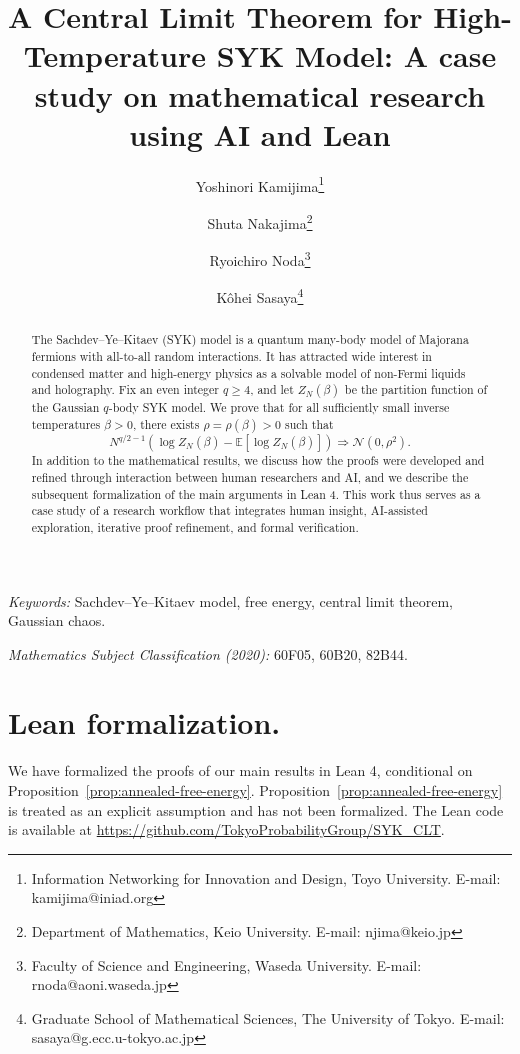 \documentclass[11pt]{article}
\title{A Central Limit Theorem for High-Temperature SYK Model: A case study on mathematical research using AI and Lean}
\author{Yoshinori Kamijima\thanks{Information Networking for Innovation and Design, Toyo University. E-mail: kamijima@iniad.org}
\and Shuta Nakajima\thanks{Department of Mathematics, Keio University. E-mail: njima@keio.jp}
\and Ryoichiro Noda\thanks{Faculty of Science and Engineering, Waseda University.
E-mail: r\textunderscore noda@aoni.waseda.jp}
\and K\^{o}hei Sasaya\thanks{Graduate School of Mathematical Sciences, The University of Tokyo. E-mail: sasaya@g.ecc.u-tokyo.ac.jp}
}
\date{}
\theoremstyle{remark}
\newcommand{\E}{\mathbb E}
\newcommand{\N}{\mathcal N}
\begin{document}
\maketitle

\begin{abstract}
The Sachdev--Ye--Kitaev (SYK) model is a quantum many-body model of Majorana
fermions with all-to-all random interactions. It has attracted wide interest in condensed matter and high-energy physics as a solvable model of non-Fermi liquids and holography. Fix an even integer $q\geq4$, and let $Z_N(\beta)$ be the
partition function of the Gaussian $q$-body SYK model.  We prove that for all sufficiently small inverse temperatures
$\beta > 0$, there exists $\rho=\rho(\beta)>0$ such that
\[
N^{q/2 -1}(\log Z_N(\beta)-\E[\log Z_N(\beta)])
  \Longrightarrow \N(0,\rho^2).
\]
In addition to the mathematical results, we discuss how the proofs were developed and refined through interaction between human researchers and AI, and we describe the subsequent formalization of the main arguments in Lean 4.
This work thus serves as a case study of a research workflow that integrates human insight, AI-assisted exploration, iterative proof refinement, and formal verification.
\end{abstract}

\noindent\emph{Keywords:} Sachdev--Ye--Kitaev model,
free energy, central limit theorem, Gaussian chaos.

\medskip
\noindent\emph{Mathematics Subject Classification (2020):}
60F05, 60B20, 82B44.








\appendix
\section*{Lean formalization.}
We have formalized the proofs of our main results in Lean 4, conditional
on Proposition~\ref{prop:annealed-free-energy}. Proposition~\ref{prop:annealed-free-energy} is
treated as an explicit assumption and has not
been formalized. 
The Lean code is available at
\url{https://github.com/TokyoProbabilityGroup/SYK_CLT}.
\end{document}
